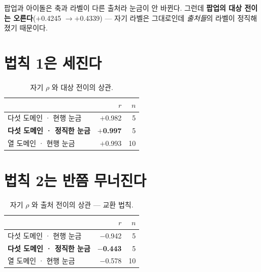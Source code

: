\documentclass[10pt]{article}
\begin{document}
팝업과 아이돌은 축과 라벨이 다른 출처라 눈금이 안 바뀐다. 그런데
\textbf{팝업의 대상 전이는 오른다}($+$0.4245 $\to+$0.4339) --- 자기 라벨은
그대로인데 \emph{출처들}의 라벨이 정직해졌기 때문이다.


\section{법칙 1은 세진다}

\begin{table}[t]
\centering\tsize
\caption{자기 $\rho$ 와 대상 전이의 상관.}
\begin{tabular}{lrr}
\toprule
& $r$ & $n$ \\
\midrule
다섯 도메인 · 현행 눈금 & $+$0.982 & 5 \\
\textbf{다섯 도메인 · 정직한 눈금} & \textbf{$+$0.997} & 5 \\
열 도메인 · 현행 눈금 & $+$0.993 & 10 \\
\bottomrule
\end{tabular}
\end{table}


\section{법칙 2는 반쯤 무너진다}

\begin{table}[t]
\centering\tsize
\caption{자기 $\rho$ 와 출처 전이의 상관 --- 교환 법칙.}
\begin{tabular}{lrr}
\toprule
& $r$ & $n$ \\
\midrule
다섯 도메인 · 현행 눈금 & $-$0.942 & 5 \\
\textbf{다섯 도메인 · 정직한 눈금} & \textbf{$-$0.443} & 5 \\
열 도메인 · 현행 눈금 & $-$0.578 & 10 \\
\bottomrule
\end{tabular}
\end{table}
\end{document}

